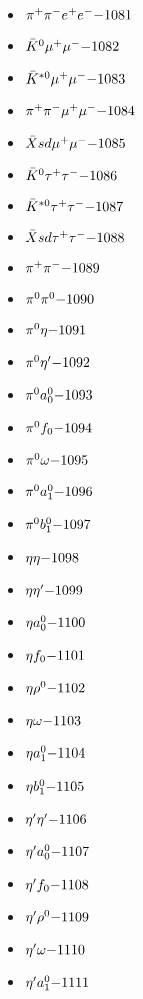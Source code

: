 \begin{multicols}{3}
\begin{itemize}
 \item $ \pi^{+} \pi^{-} e^{+} e^{-} \hfill{-1081}$
 \item $ \bar{K}^{0} \mu^{+} \mu^{-} \hfill{-1082}$
 \item $ \bar{K}^{*0} \mu^{+} \mu^{-} \hfill{-1083}$
 \item $ \pi^{+} \pi^{-} \mu^{+} \mu^{-} \hfill{-1084}$
 \item $ \bar{X}sd \mu^{+} \mu^{-} \hfill{-1085}$
 \item $ \bar{K}^{0} \tau^{+} \tau^{-} \hfill{-1086}$
 \item $ \bar{K}^{*0} \tau^{+} \tau^{-} \hfill{-1087}$
 \item $ \bar{X}sd \tau^{+} \tau^{-} \hfill{-1088}$
 \item $ \pi^{+} \pi^{-} \hfill{-1089}$
 \item $ \pi^{0} \pi^{0} \hfill{-1090}$
 \item $ \pi^{0} \eta \hfill{-1091}$
 \item $ \pi^{0} {\eta^{\prime}} \hfill{-1092}$
 \item $ \pi^{0} a_{0}^{0} \hfill{-1093}$
 \item $ \pi^{0} f_{0} \hfill{-1094}$
 \item $ \pi^{0} \omega \hfill{-1095}$
 \item $ \pi^{0} a_{1}^{0} \hfill{-1096}$
 \item $ \pi^{0} b_{1}^{0} \hfill{-1097}$
 \item $ \eta \eta \hfill{-1098}$
 \item $ \eta {\eta^{\prime}} \hfill{-1099}$
 \item $ \eta a_{0}^{0} \hfill{-1100}$
 \item $ \eta f_{0} \hfill{-1101}$
 \item $ \eta \rho^{0} \hfill{-1102}$
 \item $ \eta \omega \hfill{-1103}$
 \item $ \eta a_{1}^{0} \hfill{-1104}$
 \item $ \eta b_{1}^{0} \hfill{-1105}$
 \item $ {\eta^{\prime}} {\eta^{\prime}} \hfill{-1106}$
 \item $ {\eta^{\prime}} a_{0}^{0} \hfill{-1107}$
 \item $ {\eta^{\prime}} f_{0} \hfill{-1108}$
 \item $ {\eta^{\prime}} \rho^{0} \hfill{-1109}$
 \item $ {\eta^{\prime}} \omega \hfill{-1110}$
 \item $ {\eta^{\prime}} a_{1}^{0} \hfill{-1111}$

\end{itemize}
\end{multicols}
